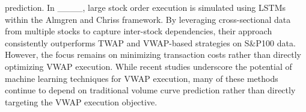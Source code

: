 prediction. In ____, large stock order execution is simulated using LSTMs within the Almgren and Chriss framework. By leveraging cross-sectional data from multiple stocks to capture inter-stock dependencies, their approach consistently outperforms TWAP and VWAP-based strategies on S\&P100 data. However, the focus remains on minimizing transaction costs rather than directly optimizing VWAP execution. While recent studies underscore the potential of machine learning techniques for VWAP execution, many of these methods continue to depend on traditional volume curve prediction rather than directly targeting the VWAP execution objective.